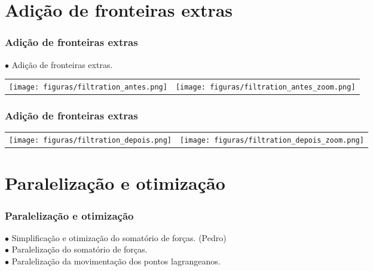 \documentclass[xcolor=dvipsnames,10pt,aspectratio=169]{beamer}
\begin{document}
	\section{ Adição de fronteiras extras }
		\begin{frame}
			\frametitle{Adição de fronteiras extras}
			$\bullet$ Adição de fronteiras extras.\\
			\begin{tabular}{c c}
				
				{\texttt{[image: figuras/filtration\_antes.png]}}&{\texttt{[image: figuras/filtration\_antes\_zoom.png]}}\\
				
			\end{tabular}


		\end{frame}
		
		\begin{frame}
			\frametitle{Adição de fronteiras extras}
			\begin{tabular}{c c}
				
				{\texttt{[image: figuras/filtration\_depois.png]}}&{\texttt{[image: figuras/filtration\_depois\_zoom.png]}}\\
				
			\end{tabular}
			
		\end{frame}
	
	
	\section{ Paralelização e otimização }
		
		\begin{frame}
			\frametitle{Paralelização e otimização}
			$\bullet$ Simplificação e otimização do somatório de forças. (Pedro)\\
			
			$\bullet$ Paralelização do somatório de forças.\\
			
			$\bullet$ Paralelização da movimentação dos pontos lagrangeanos.
			
		\end{frame}
		
\end{document}
